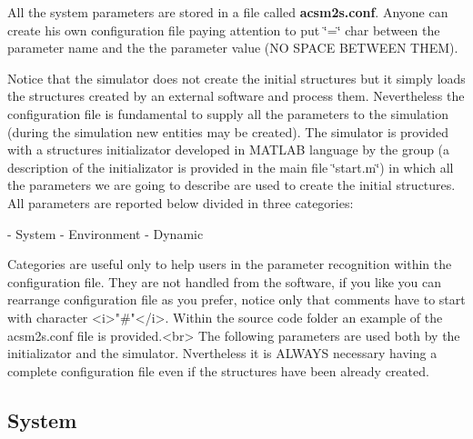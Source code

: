  All the system parameters are stored in a file called {\bfseries acsm2s.\-conf}. Anyone can create his own configuration file paying attention to put \char`\"{}=\char`\"{} char between the parameter name and the the parameter value (N\-O S\-P\-A\-C\-E B\-E\-T\-W\-E\-E\-N T\-H\-E\-M).\par
 Notice that the simulator does not create the initial structures but it simply loads the structures created by an external software and process them. Nevertheless the configuration file is fundamental to supply all the parameters to the simulation (during the simulation new entities may be created). The simulator is provided with a structures initializator developed in M\-A\-T\-L\-A\-B language by the group (a description of the initializator is provided in the main file \char`\"{}start.\-m\char`\"{}) in which all the parameters we are going to describe are used to create the initial structures. All parameters are reported below divided in three categories\-: \begin{DoxyVerb}          - System
          - Environment
          - Dynamic

          Categories are useful only to help users in the parameter recognition within the configuration file. They are not handled from the software, if you like you can rearrange configuration file as you prefer, notice only that comments have to start with character <i>"#"</i>. Within the source code folder an example of the acsm2s.conf file is provided.<br>
 The following parameters are used both by the initializator and the simulator. Nvertheless it is ALWAYS necessary having a complete configuration file even if the structures have been already created.
\end{DoxyVerb}
 \hypertarget{a00002_paramsystem}{}\subsection{System}\label{a00002_paramsystem}

